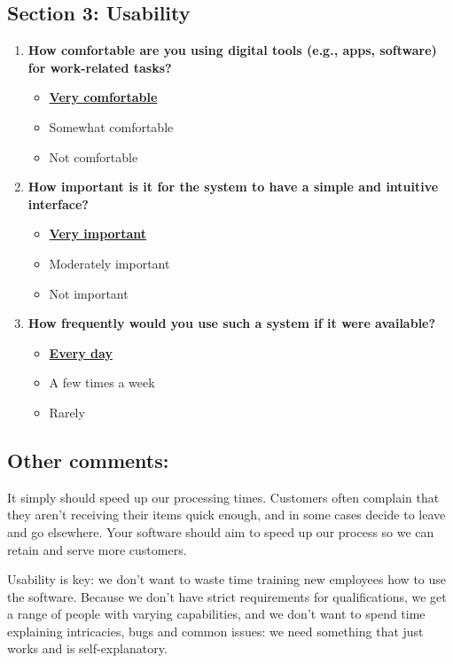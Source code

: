 \subsection*{Section 3: Usability}

\begin{enumerate}
    \item \textbf{How comfortable are you using digital tools (e.g., apps, software) for work-related tasks?}
    \begin{itemize}
        \item \textbf{\underline{Very comfortable}}
        \item Somewhat comfortable
        \item Not comfortable
    \end{itemize}

    \item \textbf{How important is it for the system to have a simple and intuitive interface?}
    \begin{itemize}
        \item \textbf{\underline{Very important}}
        \item Moderately important
        \item Not important
    \end{itemize}

    \item \textbf{How frequently would you use such a system if it were available?}
    \begin{itemize}
        \item \textbf{\underline{Every day}}
        \item A few times a week
        \item Rarely
    \end{itemize}
    
\end{enumerate}


\subsection*{Other comments:}

It simply should speed up our processing times. Customers often complain that they aren't receiving their items quick enough, and in some cases decide to leave and go elsewhere. Your software should aim to speed up our process so we can retain and serve more customers.\newline

Usability is key: we don't want to waste time training new employees how to use the software. Because we don't have strict requirements for qualifications, we get a range of people with varying capabilities, and we don't want to spend time explaining intricacies, bugs and common issues: we need something that just works and is self-explanatory.\newline

